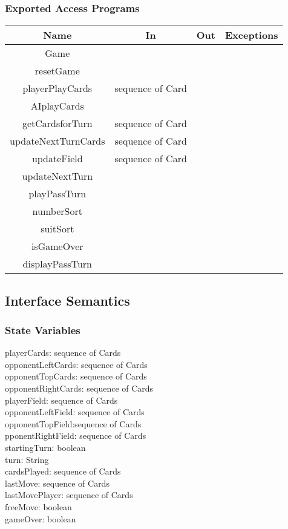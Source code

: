 \documentclass[12pt, titlepage]{article}
\begin{document}
\subsubsection{Exported Access Programs}
\begin{tabular}[pos]{|c|c|c|c|}
\hline
\textbf{Name}& \textbf{In} & \textbf{Out} & \textbf{Exceptions} \\ \hline
Game & ~ & ~ & ~ \\ \hline
resetGame & ~ & ~ & ~ \\ \hline
playerPlayCards & sequence of Card & ~ & ~ \\ \hline
AIplayCards & ~ & ~ & ~ \\ \hline
getCardsforTurn & sequence of Card & ~ & ~ \\ \hline
updateNextTurnCards & sequence of Card & ~ & ~ \\ \hline
updateField & sequence of Card & ~ & ~ \\ \hline
updateNextTurn & ~ & ~ & ~ \\ \hline
playPassTurn & ~ & ~ & ~ \\ \hline
numberSort & ~ & ~ & ~ \\ \hline
suitSort & ~ & ~ & ~ \\ \hline
isGameOver & ~ & ~ & ~ \\ \hline
displayPassTurn & ~ & ~ & ~ \\ \hline
\end{tabular}
\subsection{Interface Semantics}
\subsubsection{State Variables}
playerCards: sequence of Cards\\
opponentLeftCards: sequence of Cards\\
opponentTopCards: sequence of Cards\\
opponentRightCards: sequence of Cards\\
playerField: sequence of Cards\\
opponentLeftField: sequence of Cards\\
opponentTopField:sequence of Cards\\
pponentRightField: sequence of Cards\\
startingTurn: boolean\\
turn: String\\ 
cardsPlayed: sequence of Cards \\
lastMove: sequence of Cards \\
lastMovePlayer: sequence of Cards \\
freeMove: boolean\\
gameOver: boolean\\
\end{document}

